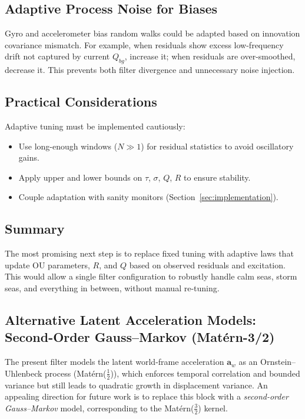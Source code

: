\documentclass[10pt]{extarticle}
\begin{document}
\subsection{Adaptive Process Noise for Biases}
Gyro and accelerometer bias random walks could be adapted based on innovation covariance mismatch.
For example, when residuals show excess low-frequency drift not captured by current $Q_{bg}$,
increase it; when residuals are over-smoothed, decrease it. This prevents both filter divergence
and unnecessary noise injection.

\subsection{Practical Considerations}
Adaptive tuning must be implemented cautiously:
\begin{itemize}
\item Use long-enough windows ($N\gg 1$) for residual statistics to avoid oscillatory gains.
\item Apply upper and lower bounds on $\tau$, $\sigma$, $Q$, $R$ to ensure stability.
\item Couple adaptation with sanity monitors (Section~\ref{sec:implementation}).
\end{itemize}

\subsection{Summary}
The most promising next step is to replace fixed tuning with adaptive laws that update
OU parameters, $R$, and $Q$ based on observed residuals and excitation. This would allow
a single filter configuration to robustly handle calm seas, storm seas, and everything in
between, without manual re-tuning.

\subsection{Alternative Latent Acceleration Models: Second-Order Gauss--Markov (Mat\'ern-3/2)}

The present filter models the latent world-frame acceleration $\bm a_w$ as an Ornstein--Uhlenbeck
process (Mat\'ern($\tfrac{1}{2}$)), which enforces temporal correlation and bounded variance but
still leads to quadratic growth in displacement variance. An appealing direction for future work
is to replace this block with a \emph{second-order Gauss--Markov} model, corresponding to the
Mat\'ern($\tfrac{3}{2}$) kernel.
\end{document}
